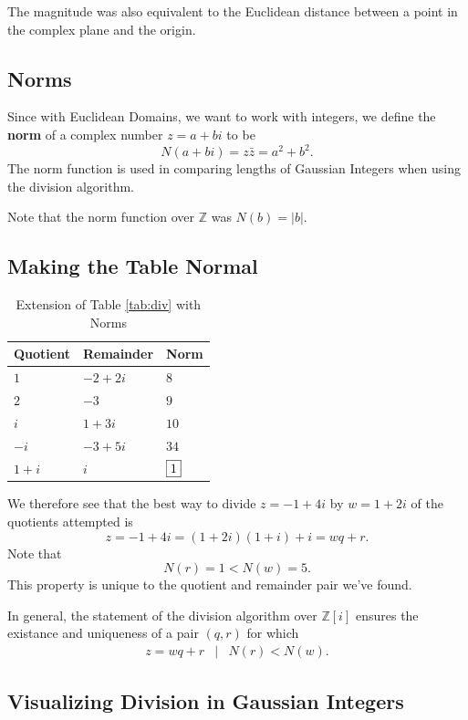 The magnitude was also equivalent to the Euclidean distance between a point in the complex plane and the origin.

\subsection{Norms}

Since with Euclidean Domains, we want to work with integers, we define the \textbf{norm} of a complex number $z=a+bi$ to be $$N(a+bi)=z\bar{z}=a^2+b^2.$$  
The norm function is used in comparing lengths of Gaussian Integers when using the division algorithm.  

Note that the norm function over $\mathbb{Z}$ was $N(b)=|b|$.  

\clearpage

\subsection*{Making the Table Normal}


\begin{table}[h]
	\centering
	\begin{tabular}{l l l }
		\toprule
		Quotient & Remainder & Norm \\
		\midrule
		$1$ & $-2+2i$ & $8$ \\
		$2$ & $-3$ & $9$  \\ 
		$i$ & $1+3i$ & $10$ \\
		$-i$ & $-3+5i$ & $34$\\
		$1+i$ & $i$ & $\framebox{1}$ \\ 
		\bottomrule
	\end{tabular}
	\caption{Extension of Table \ref{tab:div} with Norms}
\end{table}

\clearpage

We therefore see that the best way to divide $z=-1+4i$ by $w=1+2i$ of the quotients attempted is $$z=-1+4i=(1+2i)(1+i)+i=wq+r.$$  Note that $$N(r)=1<N(w)=5.$$  This property is unique to the quotient and remainder pair we've found.  

In general, the statement of the division algorithm over $\mathbb{Z}[i]$ ensures the existance and uniqueness of a pair $(q,r)$ for which  \begin{eqnarray*} z=wq+r &|& N(r)<N(w). \end{eqnarray*}  

\subsection{Visualizing Division in Gaussian Integers}


